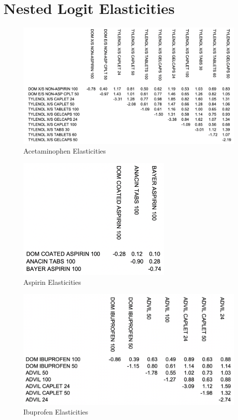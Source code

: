 \documentclass[12pt, authoryear]{elsarticle}
\begin{document}
\section{Nested Logit Elasticities} \label{app2}

\begin{figure}[H]
	\centering
	\includegraphics[clip, angle=0, width=1\textwidth]{elas1}
	\caption{Acetaminophen Elasticities }\label{elas1}
\end{figure}

\begin{figure}[H]
	\centering
	\includegraphics[clip, angle=0, width=7.5cm]{elas2}
	\caption{Aspirin Elasticities }\label{elas2}
\end{figure}

\begin{figure}[H]
	\centering
	\includegraphics[clip, angle=0, width=12cm]{elas3}
	\caption{Ibuprofen Elasticities }\label{elas3}
\end{figure}
\end{document}
